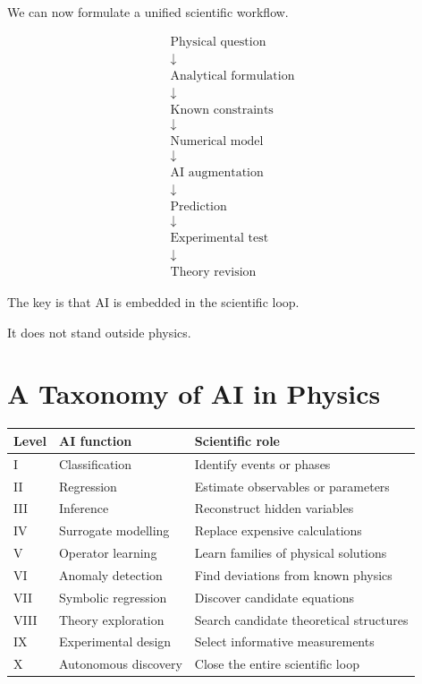 \documentclass[11pt,a4paper,oneside]{book}
\begin{document}
We can now formulate a unified scientific workflow.

\begin{equation}
\boxed{
\begin{array}{c}
\text{Physical question}\\
\downarrow\\
\text{Analytical formulation}\\
\downarrow\\
\text{Known constraints}\\
\downarrow\\
\text{Numerical model}\\
\downarrow\\
\text{AI augmentation}\\
\downarrow\\
\text{Prediction}\\
\downarrow\\
\text{Experimental test}\\
\downarrow\\
\text{Theory revision}
\end{array}}
\end{equation}

The key is that AI is embedded in the scientific loop.

It does not stand outside physics.

\chapter{A Taxonomy of AI in Physics}

\begin{longtable}{p{}p{}p{}}
\toprule
Level & AI function & Scientific role\\
\midrule
I & Classification & Identify events or phases\\
II & Regression & Estimate observables or parameters\\
III & Inference & Reconstruct hidden variables\\
IV & Surrogate modelling & Replace expensive calculations\\
V & Operator learning & Learn families of physical solutions\\
VI & Anomaly detection & Find deviations from known physics\\
VII & Symbolic regression & Discover candidate equations\\
VIII & Theory exploration & Search candidate theoretical structures\\
IX & Experimental design & Select informative measurements\\
X & Autonomous discovery & Close the entire scientific loop\\
\bottomrule
\end{longtable}
\end{document}
